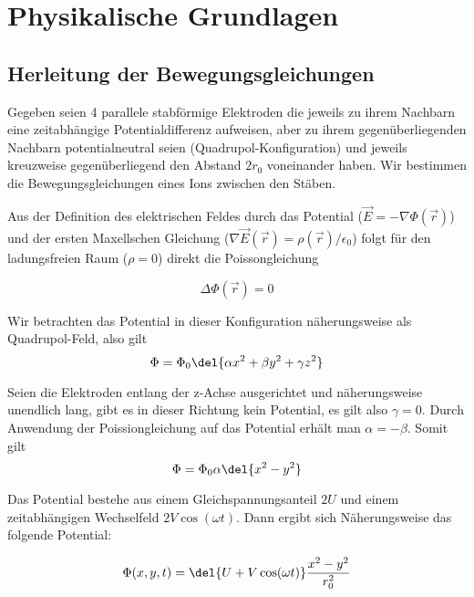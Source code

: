 \documentclass[a4paper,german,12pt,smallheadings]{scrartcl}
\begin{document}
\begin{titlepage}

\end{titlepage}

\allowdisplaybreaks %

\section{Physikalische Grundlagen}
\subsection{Herleitung der Bewegungsgleichungen}

Gegeben seien 4 parallele stabförmige Elektroden die jeweils zu ihrem Nachbarn
eine zeitabhängige Potentialdifferenz aufweisen, aber zu ihrem
gegenüberliegenden Nachbarn potentialneutral seien (Quadrupol-Konfiguration)
und jeweils kreuzweise gegenüberliegend den Abstand $2r_0$ voneinander haben.
Wir bestimmen die Bewegungsgleichungen eines Ions zwischen den Stäben.

Aus der Definition des elektrischen Feldes durch das Potential
($\vec{E} = - \nabla \Phi(\vec{r})$) und der ersten Maxellschen Gleichung
($\nabla \vec{E}(\vec{r}) = \rho(\vec{r}) / \epsilon_0$) folgt für den ladungsfreien
Raum ($\rho = 0$) direkt die Poissongleichung

\begin{equation}
  \Delta \Phi(\vec{r}) = 0
\end{equation}

Wir betrachten das Potential in dieser Konfiguration näherungsweise als
Quadrupol-Feld, also gilt
\begin{equation}
  \Phi = \Phi_0 \del{\alpha x^2 + \beta y^2 + \gamma z^2}
\end{equation}

Seien die Elektroden entlang der z-Achse ausgerichtet und näherungsweise
unendlich lang, gibt es in dieser Richtung kein Potential, es gilt also $\gamma
= 0$. Durch Anwendung der Poissiongleichung auf das Potential erhält man
$\alpha = -\beta$. Somit gilt
\begin{equation}
  \Phi = \Phi_0 \alpha \del{x^2 - y^2}
\end{equation}

Das Potential bestehe aus einem Gleichspannungsanteil $2U$ und einem
zeitabhängigen Wechselfeld $2V \cos(\omega t)$. Dann ergibt sich Näherungsweise das folgende Potential:

\begin{equation}
  \Phi(x,y,t) = \del{U + V \cos(\omega t)} \frac{x^2-y^2}{r_0^2}
\end{equation}
\end{document}
